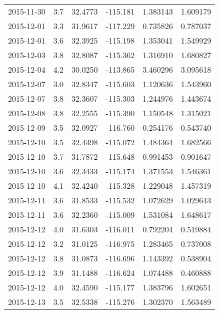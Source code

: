 \begin{tabular}{lrrrrr}
2015-11-30 &       3.7 &  32.4773 &  -115.181 &         1.383143 &         1.609179 \\
2015-12-01 &       3.3 &  31.9617 &  -117.229 &         0.735826 &         0.787037 \\
2015-12-01 &       3.6 &  32.3925 &  -115.198 &         1.353041 &         1.549929 \\
2015-12-03 &       3.8 &  32.8087 &  -115.362 &         1.316910 &         1.680827 \\
2015-12-04 &       4.2 &  30.0250 &  -113.865 &         3.460296 &         3.095618 \\
2015-12-07 &       3.0 &  32.8347 &  -115.603 &         1.120636 &         1.543960 \\
2015-12-07 &       3.8 &  32.3607 &  -115.303 &         1.244976 &         1.443674 \\
2015-12-08 &       3.8 &  32.2555 &  -115.390 &         1.150548 &         1.315021 \\
2015-12-09 &       3.5 &  32.0927 &  -116.760 &         0.254176 &         0.543740 \\
2015-12-10 &       3.5 &  32.4398 &  -115.072 &         1.484364 &         1.682566 \\
2015-12-10 &       3.7 &  31.7872 &  -115.648 &         0.991453 &         0.901647 \\
2015-12-10 &       3.6 &  32.3433 &  -115.174 &         1.371553 &         1.546361 \\
2015-12-10 &       4.1 &  32.4240 &  -115.328 &         1.229048 &         1.457319 \\
2015-12-11 &       3.6 &  31.8533 &  -115.532 &         1.072629 &         1.029643 \\
2015-12-11 &       3.6 &  32.2360 &  -115.009 &         1.531084 &         1.648617 \\
2015-12-12 &       4.0 &  31.6303 &  -116.011 &         0.792204 &         0.519884 \\
2015-12-12 &       3.2 &  31.0125 &  -116.975 &         1.283465 &         0.737008 \\
2015-12-12 &       3.8 &  31.0873 &  -116.696 &         1.143392 &         0.538904 \\
2015-12-12 &       3.9 &  31.1488 &  -116.624 &         1.074488 &         0.460888 \\
2015-12-12 &       4.0 &  32.4590 &  -115.177 &         1.383796 &         1.602651 \\
2015-12-13 &       3.5 &  32.5338 &  -115.276 &         1.302370 &         1.563489 \\

\end{tabular}

